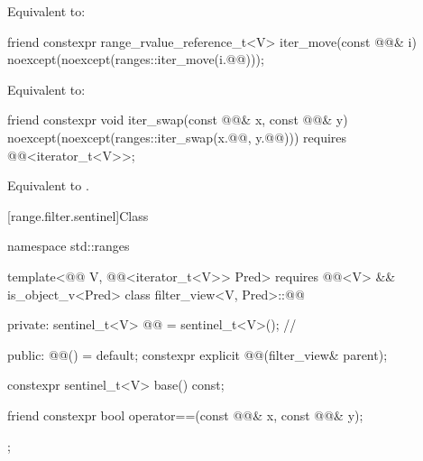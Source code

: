 \begin{itemdescr}
\pnum
\effects
Equivalent to: 
\end{itemdescr}

%
\begin{itemdecl}
friend constexpr range_rvalue_reference_t<V> iter_move(const @@& i)
  noexcept(noexcept(ranges::iter_move(i.@@)));
\end{itemdecl}

\begin{itemdescr}
\pnum
\effects
Equivalent to: 
\end{itemdescr}

%
\begin{itemdecl}
friend constexpr void iter_swap(const @@& x, const @@& y)
  noexcept(noexcept(ranges::iter_swap(x.@@, y.@@)))
  requires @@<iterator_t<V>>;
\end{itemdecl}

\begin{itemdescr}
\pnum
\effects
Equivalent to .
\end{itemdescr}

[range.filter.sentinel]{Class }

%
%
\begin{codeblock}
namespace std::ranges {
  template<@@ V, @@<iterator_t<V>> Pred>
    requires @@<V> && is_object_v<Pred>
  class filter_view<V, Pred>::@@ {
  private:
    sentinel_t<V> @@ = sentinel_t<V>();       // \expos

  public:
    @@() = default;
    constexpr explicit @@(filter_view& parent);

    constexpr sentinel_t<V> base() const;

    friend constexpr bool operator==(const @@& x, const @@& y);
  };
}
\end{codeblock}

